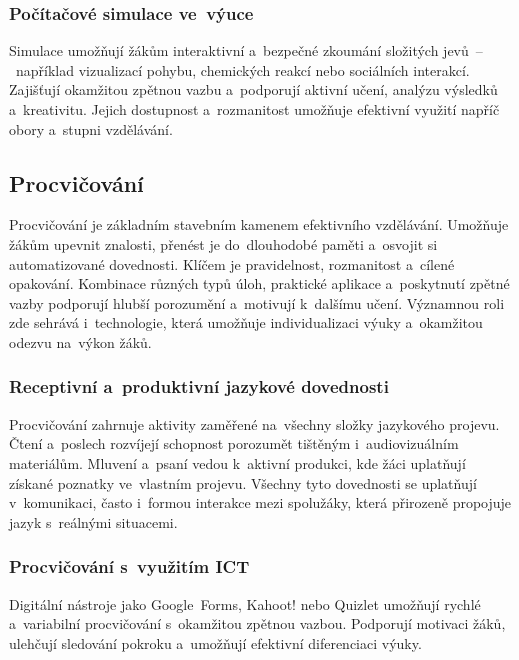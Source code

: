 \documentclass[male,czech,api_bc]{kitheses}
\begin{document}
\newpage

\subsubsection{Počítačové simulace ve~výuce}

Simulace umožňují žákům interaktivní a~bezpečné zkoumání složitých jevů~--~například vizualizací pohybu, chemických reakcí nebo sociálních interakcí. Zajišťují okamžitou zpětnou vazbu a~podporují aktivní učení, analýzu výsledků a~kreativitu. Jejich dostupnost a~rozmanitost umožňuje efektivní využití napříč obory a~stupni vzdělávání.\cite{eduPocitacoveSimulace}

\subsection{Procvičování}

Procvičování je základním stavebním kamenem efektivního vzdělávání. Umožňuje žákům upevnit znalosti, přenést je do~dlouhodobé paměti a~osvojit si automatizované dovednosti. Klíčem je pravidelnost, rozmanitost a~cílené opakování. Kombinace různých typů úloh, praktické aplikace a~poskytnutí zpětné vazby podporují hlubší porozumění a~motivují k~dalšímu učení. Významnou roli zde sehrává i~technologie, která umožňuje individualizaci výuky a~okamžitou odezvu na~výkon žáků.\cite{eduProcvicovani}

\subsubsection{Receptivní a~produktivní jazykové dovednosti}

Procvičování zahrnuje aktivity zaměřené na~všechny složky jazykového projevu. Čtení a~poslech rozvíjejí schopnost porozumět tištěným i~audiovizuálním materiálům. Mluvení a~psaní vedou k~aktivní produkci, kde žáci uplatňují získané poznatky ve~vlastním projevu. Všechny tyto dovednosti se uplatňují v~komunikaci, často i~formou interakce mezi spolužáky, která přirozeně propojuje jazyk s~reálnými situacemi.\cite{eduCteni}\cite{eduPsani}\cite{eduPoslech}\cite{eduMluveni}\cite{eduInterakce}

\subsubsection{Procvičování s~využitím ICT}

Digitální nástroje jako Google~Forms, Kahoot! nebo Quizlet umožňují rychlé a~variabilní procvičování s~okamžitou zpětnou vazbou. Podporují motivaci žáků, ulehčují sledování pokroku a~umožňují efektivní diferenciaci výuky.\cite{eduProcvICT}
\end{document}
